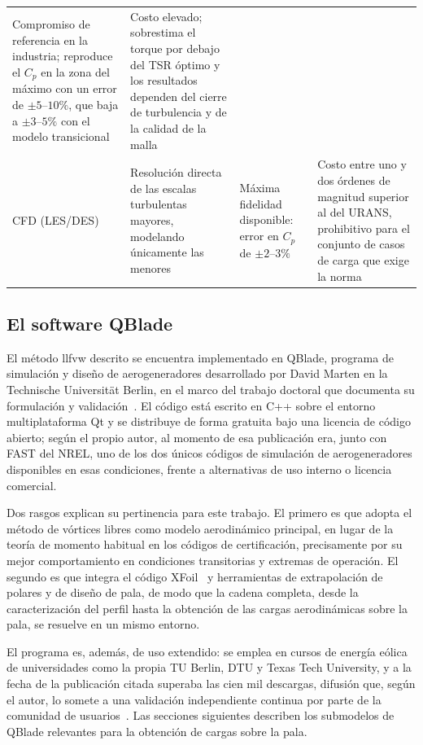 \begin{table}[H]
\begin{tabular}{p{2.2cm} p{3.3cm} p{3.4cm} p{4.4cm}}
        Compromiso de referencia en la industria; reproduce el $C_p$ en la zona del máximo con un error de $\pm 5$--$10\%$, que baja a $\pm 3$--$5\%$ con el modelo transicional &
        Costo elevado; sobrestima el torque por debajo del TSR óptimo y los resultados dependen del cierre de turbulencia y de la calidad de la malla~\parencite{Essahraoui2026} \\
        CFD (LES/DES) &
        Resolución directa de las escalas turbulentas mayores, modelando únicamente las menores &
        Máxima fidelidad disponible: error en $C_p$ de $\pm 2$--$3\%$ &
        Costo entre uno y dos órdenes de magnitud superior al del URANS, prohibitivo para el conjunto de casos de carga que exige la norma~\parencite{Essahraoui2026} \\
        \hline
    \end{tabular}
\end{table}

\subsection{El software QBlade}
\label{sec:qblade}

El método \gls{llfvw} descrito se encuentra implementado en QBlade, programa de simulación y diseño de aerogeneradores desarrollado por David Marten en la Technische Universität Berlin, en el marco del trabajo doctoral que documenta su formulación y validación~\parencite{marten2019qblade}. El código está escrito en C++ sobre el entorno multiplataforma Qt y se distribuye de forma gratuita bajo una licencia de código abierto; según el propio autor, al momento de esa publicación era, junto con FAST del NREL, uno de los dos únicos códigos de simulación de aerogeneradores disponibles en esas condiciones, frente a alternativas de uso interno o licencia comercial.

Dos rasgos explican su pertinencia para este trabajo. El primero es que adopta el método de vórtices libres como modelo aerodinámico principal, en lugar de la teoría de momento habitual en los códigos de certificación, precisamente por su mejor comportamiento en condiciones transitorias y extremas de operación. El segundo es que integra el código XFoil~\parencite{drela1989xfoil} y herramientas de extrapolación de polares y de diseño de pala, de modo que la cadena completa, desde la caracterización del perfil hasta la obtención de las cargas aerodinámicas sobre la pala, se resuelve en un mismo entorno.

El programa es, además, de uso extendido: se emplea en cursos de energía eólica de universidades como la propia TU Berlin, DTU y Texas Tech University, y a la fecha de la publicación citada superaba las cien mil descargas, difusión que, según el autor, lo somete a una validación independiente continua por parte de la comunidad de usuarios~\parencite{marten2019qblade}. Las secciones siguientes describen los submodelos de QBlade relevantes para la obtención de cargas sobre la pala.

